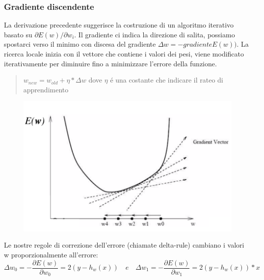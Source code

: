 \documentclass{article}
\begin{document}
\subsubsection{Gradiente discendente}
La derivazione precedente suggerisce la costruzione di un algoritmo iterativo basato su $\partial E(w) / \partial w_i$. Il gradiente ci indica la direzione di salita, possiamo spostarci verso il minimo con discesa del gradiente $\Delta w = - gradienteE(w))$. La ricerca locale inizia con il vettore che contiene i valori dei pesi, viene modificato iterativamente per diminuire fino a minimizzare l'errore della funzione.
\begin{quote}
    $w_{new} = w_{old} + \eta * \Delta w$ dove $\eta$ é una costante che indicare il rateo di apprendimento
\end{quote}
\begin{figure}[H]
    \centering
    \includegraphics[scale=0.5]{Images/gradientvector.png}
\end{figure}

Le nostre regole di correzione dell'errore (chiamate delta-rule) cambiano i valori w proporzionalmente all'errore:
\begin{equation}
    \Delta w_0 = - \frac{\partial E(w)}{\partial w_0} = 2(y - h_w(x)) \quad e \quad \Delta w_1 = - \frac{\partial E(w)}{\partial w_1} = 2(y - h_w(x)) * x
\end{equation}
\end{document}
